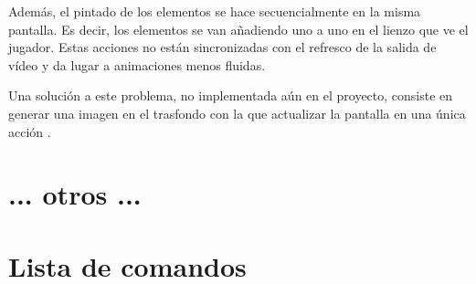 \documentclass[a4paper,
	11pt,
	parskip=full,
	bibliography=totoc,
	twoside
	]{scrartcl}
\let\oldsection\section
\def\section{\cleardoubleoddpage\oldsection}
\renewcommand{\sectionmark}[1]{\markright{\thesection.\ #1}}
\begin{document}
		Además, el pintado de los elementos se hace secuencialmente en la misma pantalla. Es decir, los elementos se van añadiendo uno a uno en el lienzo que ve el jugador. Estas acciones no están sincronizadas con el refresco de la salida de vídeo y da lugar a animaciones menos fluidas.
		
		Una solución a este problema, no implementada aún en el proyecto, consiste en generar una imagen en el trasfondo con la que actualizar la pantalla en una única acción \cite{so_graphics_performance}.

\section{ ... otros ...}

\cleardoubleoddpage
	\renewcommand{\sectionmark}[1]{}
\begin{thebibliography}{9}
	\raggedright
	
\end{thebibliography}
\markright{\appendixname}

\cleardoubleoddpage
\appendix
{}

\section{Lista de comandos}
\label{app:command_list}
	
	
\end{document}
